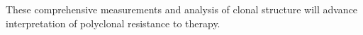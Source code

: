 These comprehensive measurements and analysis of clonal structure will advance interpretation of polyclonal resistance to therapy.


















